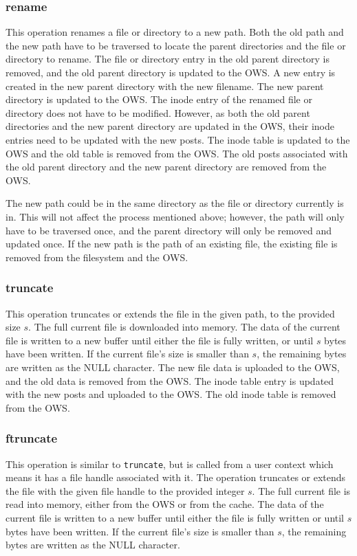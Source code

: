 \subsubsection{rename}
This operation renames a file or directory to a new path. Both the old path and the new path have to be traversed to locate the parent directories and the file or directory to rename. The file or directory entry in the old parent directory is removed, and the old parent directory is updated to the \gls{OWS}. A new entry is created in the new parent directory with the new filename. The new parent directory is updated to the \gls{OWS}. The inode entry of the renamed file or directory does not have to be modified. However, as both the old parent directories and the new parent directory are updated in the \gls{OWS}, their inode entries need to be updated with the new posts. The inode table is updated to the \gls{OWS} and the old table is removed from the \gls{OWS}. The old posts associated with the old parent directory and the new parent directory are removed from the \gls{OWS}.

The new path could be in the same directory as the file or directory currently is in. This will not affect the process mentioned above; however, the path will only have to be traversed once, and the parent directory will only be removed and updated once. If the new path is the path of an existing file, the existing file is removed from the filesystem and the \gls{OWS}.

\subsubsection{truncate}
This operation truncates or extends the file in the given path, to the provided size $s$. The full current file is downloaded into memory. The data of the current file is written to a new buffer until either the file is fully written, or until $s$ bytes have been written. If the current file's size is smaller than $s$, the remaining bytes are written as the NULL character. The new file data is uploaded to the \gls{OWS}, and the old data is removed from the \gls{OWS}. The inode table entry is updated with the new posts and uploaded to the \gls{OWS}. The old inode table is removed from the \gls{OWS}.

\subsubsection{ftruncate}
This operation is similar to \texttt{truncate}, but is called from a user context which means it has a file handle associated with it. The operation truncates or extends the file with the given file handle to the provided integer $s$. The full current file is read into memory, either from the \gls{OWS} or from the cache. The data of the current file is written to a new buffer until either the file is fully written or until $s$ bytes have been written. If the current file's size is smaller than $s$, the remaining bytes are written as the NULL character.


